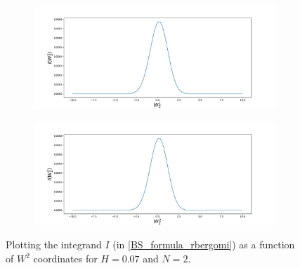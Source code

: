 \documentclass[11pt]{article}
\begin{document}
 \begin{figure}[h!]
 	\centering
 	\begin{subfigure}{.4\textwidth}
 		\centering
 		\includegraphics[width=1\linewidth]{./figures/integrand_plotting_rBergomi/1D_plots/N_2/H_007/Bergomi_integrand_K_1_H_007_W21_N_2}
 		\caption{}
 		\label{fig:sub3}
 	\end{subfigure}%
 	\begin{subfigure}{.4\textwidth}
 		\centering
 		\includegraphics[width=1\linewidth]{./figures/integrand_plotting_rBergomi/1D_plots/N_2/H_007/Bergomi_integrand_K_1_H_007_W22_N_2}
 		\caption{}
 		\label{fig:sub4}
 	\end{subfigure}
 	\caption{Plotting the integrand $I$ (in \eqref{BS_formula_rbergomi}) as a function of $W^2$ coordinates for $H=0.07$ and $N=2$.}
 	\label{fig:Integrand_H_007_N_2_W_2}
 \end{figure}
 
\end{document}
